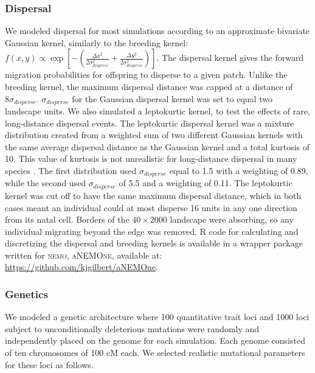 \subsubsection*{Dispersal}
We modeled dispersal for most simulations according to an approximate bivariate Gaussian kernel, similarly to the breeding kernel: $f(x,y) \propto \exp{[-(\frac{\Delta x^2}{2\sigma_{disperse}^2}+\frac{\Delta y^2}{2\sigma_{disperse}^2})]}$. The dispersal kernel gives the forward migration probabilities for offspring to disperse to a given patch. Unlike the breeding kernel, the maximum dispersal distance was capped at a distance of $8\sigma_{disperse}$. $\sigma_{disperse}$ for the Gaussian dispersal kernel was set to equal two landscape units. We also simulated a leptokurtic kernel, to test the effects of rare, long-distance dispersal events. The leptokurtic dispersal kernel was a mixture distribution created from a weighted sum of two different Gaussian kernels \citep{Ibrahim:1996} with the same average dispersal distance as the Gaussian kernel and a total kurtosis of 10. This value of kurtosis is not unrealistic for long-distance dispersal in many species \citep{Guttal:2011, Lowe:2009, Skalski:2000}. The first distribution used $\sigma_{disperse}$ equal to 1.5 with a weighting of 0.89, while the second used $\sigma_{disperse}$ of 5.5 and a weighting of 0.11. The leptokurtic kernel was cut off to have the same maximum dispersal distance, which in both cases meant an individual could at most disperse 16 units in any one direction from its natal cell. Borders of the $40\times2000$ landscape were absorbing, so any individual migrating beyond the edge was removed. R code for calculating and discretizing the dispersal and breeding kernels is available in a wrapper package written for \textsc{nemo}, \textsc{aNEMOne}, available at: \url{https://github.com/kjgilbert/aNEMOne}.


\subsubsection*{Genetics}
We modeled a genetic architecture where 100 quantitative trait loci and 1000 loci subject to unconditionally deleterious mutations were randomly and independently placed on the genome for each simulation. Each genome consisted of ten chromosomes of 100 cM each. We selected realistic mutational parameters for these loci as follows.

